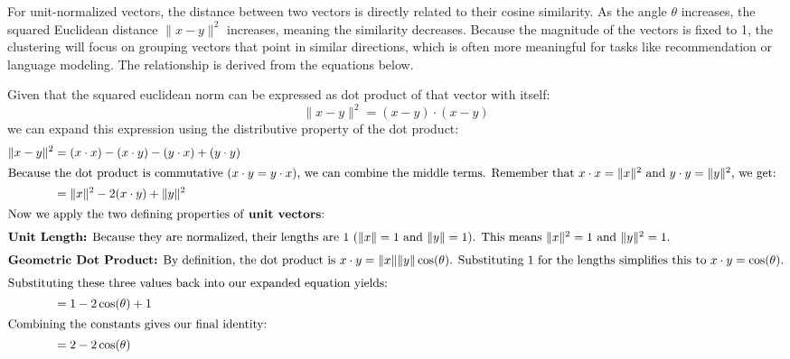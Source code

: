 \documentclass[twoside, 10pt]{article}
\begin{document}
For unit-normalized vectors, the distance between two vectors is directly related to their cosine similarity. As the angle $\theta$ increases, the squared Euclidean distance $\|x-y\|^2$ increases, meaning the similarity decreases. Because the magnitude of the vectors is fixed to 1, the clustering will focus on grouping vectors that point in similar directions, which is often more meaningful for tasks like recommendation or language modeling. The relationship is derived from the equations below.

Given that the squared euclidean norm can be expressed as  dot product of that vector with itself:
\begin{equation}
\lVert x - y \rVert^2 = (x - y) \cdot (x - y)
\end{equation}
we can expand this expression using the distributive property of the dot product:
\begin{align}
\lVert x - y \rVert^2 &= (x \cdot x) - (x \cdot y) - (y \cdot x) + (y \cdot y) \\
\intertext{Because the dot product is commutative ($x \cdot y = y \cdot x$), we can combine the middle terms. Remember that $x \cdot x = \lVert x \rVert^2$ and $y \cdot y = \lVert y \rVert^2$, we get:}
&= \lVert x \rVert^2 - 2(x \cdot y) + \lVert y \rVert^2 \\
\intertext{Now we apply the two defining properties of \textbf{unit vectors}:}
\intertext{\textbf{Unit Length:} Because they are normalized, their lengths are 1 ($\lVert x \rVert = 1$ and $\lVert y \rVert = 1$). This means $\lVert x \rVert^2 = 1$ and $\lVert y \rVert^2 = 1$.}
\intertext{\textbf{Geometric Dot Product:} By definition, the dot product is $x \cdot y = \lVert x \rVert \lVert y \rVert \cos(\theta)$. Substituting 1 for the lengths simplifies this to $x \cdot y = \cos(\theta)$.}
\intertext{Substituting these three values back into our expanded equation yields:}
&= 1 - 2\cos(\theta) + 1 \nonumber \\ %
\intertext{Combining the constants gives our final identity:}
&= 2 - 2\cos(\theta)
\end{align}
\end{document}
